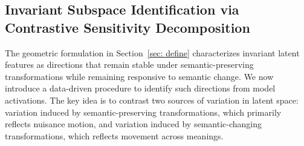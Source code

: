 \subsection{Invariant Subspace Identification via Contrastive Sensitivity Decomposition}
\label{sec: find}

The geometric formulation in Section~\ref{sec: define} characterizes invariant latent features as directions that remain stable under semantic-preserving transformations while remaining responsive to semantic change. We now introduce a data-driven procedure to identify such directions from model activations. The key idea is to contrast two sources of variation in latent space: variation induced by semantic-preserving transformations, which primarily reflects nuisance motion, and variation induced by semantic-changing transformations, which reflects movement across meanings.

